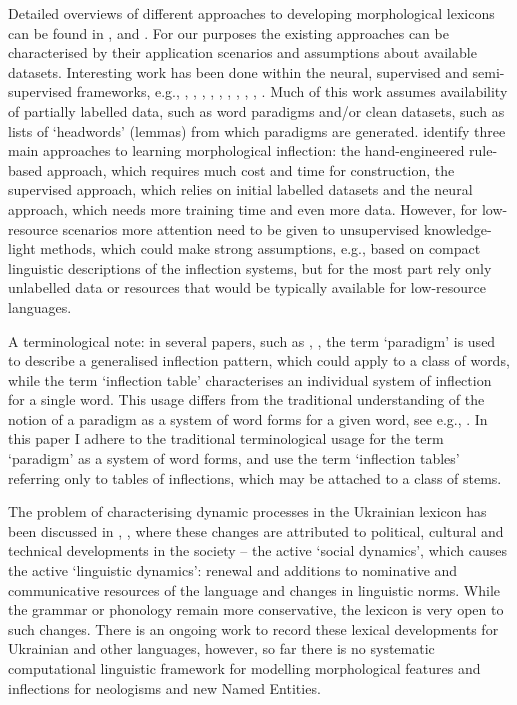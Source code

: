 \documentclass[11pt,a4paper]{article}
\begin{document}
Detailed overviews of different approaches to developing morphological lexicons can be found in \cite{ahlberg2015paradigm}, \cite{koskenniemi2018guessing} and  \cite{fam2018ips}. For our purposes the existing approaches can be characterised by their application scenarios and assumptions about available datasets. Interesting work has been done within the neural, supervised and semi-supervised frameworks, e.g., \cite{ahlberg2015paradigm}, \cite{hulden2014semi}, \cite{koskenniemi2018guessing}, \cite{silfverberg2018computational}, \cite{wolf2018structured}, \cite{kirov2018recurrent}, \cite{faruqui2016morpho}, \cite{faruqui2015morphological}, \cite{aharoni2016morphological}, \cite{cotterell2017paradigm}. Much of this work assumes availability of partially labelled data, such as word paradigms and/or clean datasets, such as lists of `headwords' (lemmas) from which paradigms are generated. \cite{fam2018ips} identify three main approaches to learning morphological inflection: the hand-engineered rule-based approach, which requires much cost and time for construction, the supervised approach, which relies on initial labelled datasets and the neural approach, which needs more training time and even more data. However, for low-resource scenarios more attention need to be given to unsupervised knowledge-light methods, which could make strong assumptions, e.g., based on compact  linguistic descriptions of the inflection systems, but for the most part rely only unlabelled data or resources that would be typically available for low-resource languages.


A terminological note: in several papers, such as \cite{ahlberg2015paradigm}, \cite{silfverberg2018computational}, the term `paradigm' is used to describe a generalised inflection pattern, which could apply to a class of words, while the term `inflection table' characterises an individual system of inflection for a single word. This usage differs from the traditional understanding of the notion of a paradigm as a system of word forms for a given word, see e.g., \cite{spencer2001paradigm}. In this paper I adhere to the traditional terminological usage for the term `paradigm' as a system of word forms, and use the term `inflection tables' referring only to tables of inflections, which may be attached to a class of stems.

The problem of characterising dynamic processes in the Ukrainian lexicon has been discussed in \cite{klymenko2008dynamichni}, \cite{karpilovska2013aktyvni}, where these changes are attributed to political, cultural and technical developments in the society -- the active `social dynamics', which causes the active `linguistic dynamics': renewal and additions to nominative and communicative resources of the language and changes in linguistic norms. While the grammar or phonology remain more conservative, the lexicon is very open to such changes. There is an ongoing work to record these lexical developments for Ukrainian and other languages, however, so far there is no systematic computational linguistic framework for modelling morphological features and inflections for neologisms and new Named Entities.
\end{document}
